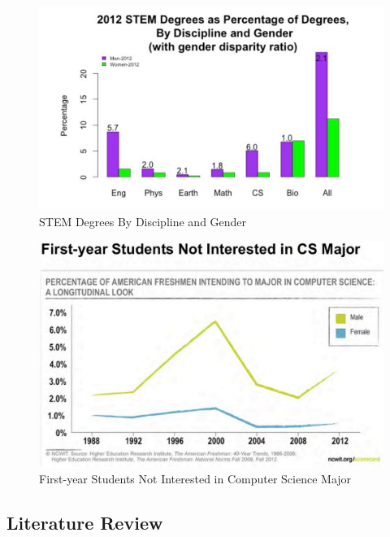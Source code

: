 \documentclass[12pt]{article}
\begin{document}
	 	\begin{figure}[H]
	 		\begin{center}
	 			\includegraphics[width = \textwidth, keepaspectratio]{genderDisparity}
	 			\caption{STEM Degrees By Discipline and Gender}
	 		\end{center}
	 	\end{figure}	 	
	 	
	 	\begin{figure}[H]
	 	\begin{center}
	 		\includegraphics[width = \textwidth, keepaspectratio]{firstYearInterest}
	 		\caption{First-year Students Not Interested in Computer Science Major}
	 	\end{center}
	 \end{figure}	
	
		
	\pagebreak
		

	
	\subsection{Literature Review}
	
\end{document}
